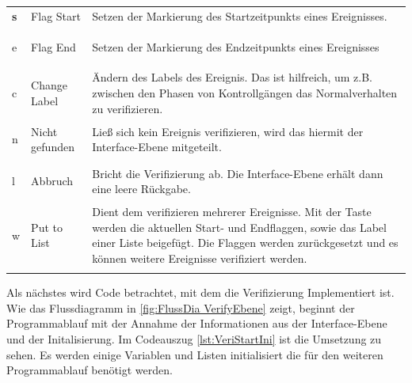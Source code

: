 \begin{longtable}{>{\bfseries} p{} p{} p{}}
s & Flag Start & Setzen der Markierung des Startzeitpunkts eines Ereignisses. \\
\addlinespace[0.7em] %

e & Flag End &  Setzen der Markierung des Endzeitpunkts eines Ereignisses \\
\addlinespace[0.7em] %

c & Change Label & Ändern des Labels des Ereignis. Das ist hilfreich, um z.B. zwischen den Phasen von Kontrollgängen das Normalverhalten zu verifizieren. \\
\addlinespace[0.7em] %

n & Nicht gefunden & Ließ sich kein Ereignis verifizieren, wird das hiermit der Interface-Ebene mitgeteilt. \\
\addlinespace[0.7em] %

l & Abbruch & Bricht die Verifizierung ab. Die Interface-Ebene erhält dann eine leere Rückgabe. \\
\addlinespace[0.7em] %

w & Put to List & Dient dem verifizieren mehrerer Ereignisse. Mit der Taste werden die aktuellen Start- und Endflaggen, sowie das Label einer Liste beigefügt. Die Flaggen werden zurückgesetzt und es können weitere Ereignisse verifiziert werden.\\
\addlinespace[0.7em] %

\end{longtable}

Als nächstes wird Code betrachtet, mit dem die Verifizierung Implementiert ist. Wie das Flussdiagramm in \autoref{fig:FlussDia VerifyEbene} zeigt, beginnt der Programmablauf mit der Annahme der Informationen aus der Interface-Ebene und der Initalisierung. Im Codeauszug \ref{lst:VeriStartIni} ist die Umsetzung zu sehen. Es werden einige Variablen und Listen initialisiert die für den weiteren Programmablauf benötigt werden.

